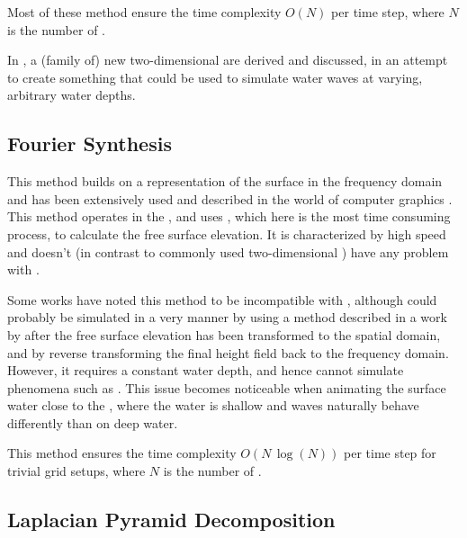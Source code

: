 Most of these method ensure the time complexity $O(N)$ per time step, where $N$ is the number of .

In , a (family of) new two-dimensional \PDEs are derived and discussed, in an attempt to create something that could be used to simulate water waves at varying, arbitrary water depths.

\subsection{Fourier Synthesis}

This method \citep{Mastin1987} builds on  a representation of the surface in the frequency domain and has been extensively used and described in the world of computer graphics \citep{Monnier}. This method operates in the , and uses \FFT, which here is the most time consuming process, to calculate the free surface elevation. It is characterized by high speed and doesn't (in contrast to commonly used two-dimensional \PDEs) have any problem with .

Some works have noted this method to be incompatible with \FSI \citep{Chentanez2011a}, although \FSI could probably be simulated in a very \approximating manner by using a method described in a work by \citet{Ottosson2011} after the free surface elevation has been transformed to the spatial domain, and by reverse transforming the final height field back to the frequency domain. However, it requires a constant water depth, and hence cannot simulate phenomena such as . This issue becomes noticeable when animating the surface water close to the , where the water is shallow and waves naturally behave differently than on deep water.

This method ensures the time complexity $O(N\,\log(N))$ per time step for trivial grid setups, where $N$ is the number of .

\subsection{Laplacian Pyramid Decomposition}
\label{sec:lacplacian_pyramid_decomposition}


